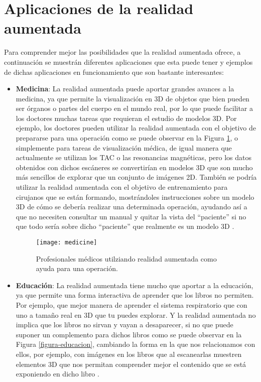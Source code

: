 \section{Aplicaciones de la realidad aumentada}
Para comprender mejor las posibilidades que la realidad aumentada ofrece, a continuación se muestrán diferentes aplicaciones que esta puede tener y ejemplos de dichas aplicaciones en funcionamiento que son bastante interesantes:

\begin{itemize}
  \item \textbf{Medicina}: La realidad aumentada puede aportar grandes avances a la medicina, ya que permite la visualización en 3D de objetos que bien pueden ser órganos o partes del cuerpo en el mundo real, por lo que puede facilitar a los doctores muchas tareas que requieran el estudio de modelos 3D. Por ejemplo, los doctores pueden utilizar la realidad aumentada con el objetivo de prepararse para una operación como se puede observar en la Figura \ref{figura-medicina}, o simplemente para tareas de visualización médica, de igual manera que actualmente se utilizan los TAC o las resonancias magnéticas, pero los datos obtenidos con dichos escáneres se convertirían en modelos 3D que son mucho más sencillos de explorar que un conjunto de imágenes 2D. También se podría utilizar la realidad aumentada con el objetivo de entrenamiento para cirujanos que se están formando, mostrándoles instrucciones sobre un modelo 3D de cómo se debería realizar una determinada operación, ayudando así a que no necesiten consultar un manual y quitar la vista del “paciente” si no que todo sería sobre dicho “paciente” que realmente es un modelo 3D \cite{azuma}.

  \begin{figure}[h]
    \centering
    \texttt{[image: medicine]}
    \caption{Profesionales médicos utilziando realidad aumentada como ayuda para una operación.\protect\footnotemark}
    \label{figura-medicina}
  \end{figure}


  \newpage

  \item \textbf{Educación}: La realidad aumentada tiene mucho que aportar a la educación, ya que permite una forma interactiva de aprender que los libros no permiten. Por ejemplo, que mejor manera de aprender el sistema respiratorio que con uno a tamaño real en 3D que tu puedes explorar. Y la realidad aumentada no implica que los libros no sirvan y vayan a desaparecer, si no que puede suponer un complemento para dichos libros como se puede observar en la Figura \ref{figura-educacion}, cambiando la forma en la que nos relacionamos con ellos, por ejemplo, con imágenes en los libros que al escanearlas muestren elementos 3D que nos permitan comprender mejor el contenido que se está exponiendo en dicho libro \cite{reinoso}.


\end{itemize}
